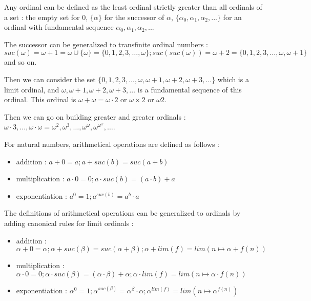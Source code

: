 \documentclass[10pt]{article}
\begin{document}
Any ordinal can be defined as the least ordinal strictly greater than all ordinals of a set : the empty set for 0, \(\lbrace \alpha \rbrace\) for the successor of \( \alpha \),  \(\lbrace \alpha_0,\alpha_1,\alpha_2,...\rbrace\) for an ordinal with fundamental sequence \(\alpha_0, \alpha_1, \alpha_2, ...\)

The successor can be generalized to transfinite ordinal numbers : \( suc(\omega) = \omega+1 =\omega \cup \lbrace \omega \rbrace = \lbrace 0, 1, 2, 3, \ldots, \omega \rbrace ; suc(suc(\omega)) = \omega+2 = \lbrace 0, 1, 2, 3, \ldots, \omega, \omega+1 \rbrace \) and so on.

Then we can consider the set \( \lbrace 0, 1, 2, 3, \ldots, \omega, \omega+1, \omega+2, \omega+3, \ldots \rbrace \) which is a limit ordinal, and \( \omega, \omega+1, \omega+2, \omega+3, \ldots \) is a fundamental sequence of this ordinal. This ordinal is \( \omega+\omega = \omega \cdot 2 \) or \( \omega \times 2 \) or \( \omega 2 \).

Then we can go on building greater and greater ordinals : \( \omega \cdot 3, \ldots, \omega \cdot \omega = \omega^2, \omega^3, \ldots, \omega^\omega, \omega^{\omega^\omega}, \ldots \).

\bigskip

For natural numbers, arithmetical operations are defined as follows :

\begin{itemize}
     \setlength{\itemsep}{1pt}
     \setlength{\parskip}{0pt}
     \setlength{\parsep}{0pt}
\item addition : \( a+0=a ; a+suc(b)=suc(a+b) \)

\item multiplication : \( a \cdot 0 = 0 ; a \cdot suc(b) = (a \cdot b) + a \)

\item exponentiation : \( a^0 = 1 ; a^{suc(b)} = a^b \cdot a  \)
\end{itemize}

The definitions of arithmetical operations can be generalized to ordinals by adding canonical rules for limit ordinals :

\begin{itemize}
     \setlength{\itemsep}{1pt}
     \setlength{\parskip}{0pt}
     \setlength{\parsep}{0pt}
\item addition : \( \alpha+0=\alpha ; \alpha+suc(\beta)=suc(\alpha+\beta); \alpha+lim(f)=lim(n \mapsto \alpha+f(n)) \)

\item multiplication : \( \alpha \cdot 0 = 0 ; \alpha \cdot suc(\beta) = (\alpha \cdot \beta) + \alpha ; \alpha \cdot lim(f) = lim (n \mapsto \alpha \cdot f(n)) \)

\item exponentiation : \( \alpha^0 = 1 ; \alpha^{suc(\beta)} = \alpha^\beta \cdot \alpha ; \alpha^{lim(f)} = lim (n \mapsto \alpha^{f(n)}) \)
\end{itemize}
\end{document}
